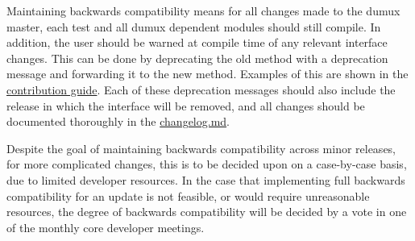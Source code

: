 Maintaining backwards compatibility means for all changes made to the dumux master, each test and all dumux dependent modules should still compile. In addition, the user should be warned at compile time of any relevant interface changes. This can be done by deprecating the old method with a deprecation message and forwarding it to the new method. Examples of this are shown in the \href{https://git.iws.uni-stuttgart.de/dumux-repositories/dumux/blob/master/CONTRIBUTING.md}{contribution guide}. Each of these deprecation messages should also include the release in which the interface will be removed, and all changes should be documented thoroughly in the \href{https://git.iws.uni-stuttgart.de/dumux-repositories/dumux/-/blob/master/CHANGELOG.md}{changelog.md}.

Despite the goal of maintaining backwards compatibility across minor releases,
for more complicated changes, this is to be decided upon on a case-by-case basis, due to limited developer resources.
In the case that implementing full backwards compatibility for an update is not feasible, or would require unreasonable resources, the degree of backwards compatibility will be decided by a vote in one of the monthly core developer meetings.
